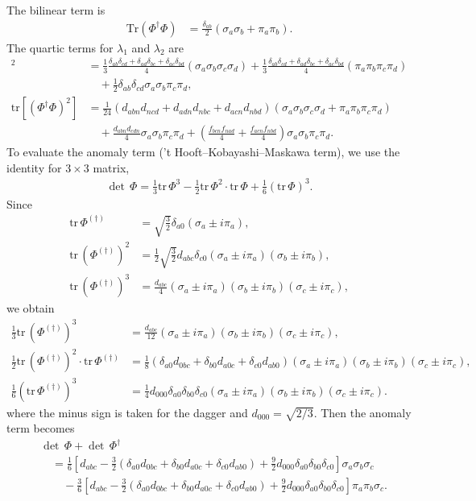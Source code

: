 \documentclass[a4paper,preprint,superscriptaddress,preprintnumbers,nofootinbib]{revtex4}
\newcommand{\al}[1]{\begin{align}#1\end{align}}
\newcommand{\nn}{\nonumber\\}
\newcommand{\tr}{\text{tr}}
\begin{document}
\begin{appendix}
The bilinear term is
\al{
\text{Tr}(\Phi^\dagger\Phi)&=\frac{\delta_{ab}}{2}(\sigma_a\sigma_b+\pi_a\pi_b).
}
The quartic terms for $\lambda_1$ and $\lambda_2$ are 
\al{
[\tr(\Phi^\dagger\Phi)]^2
&=\frac{1}{3}\frac{\delta_{ab}\delta_{cd}+\delta_{ad}\delta_{bc}+\delta_{ac}\delta_{bd}}{4}
(\sigma_a\sigma_b\sigma_c\sigma_d)
+\frac{1}{3}\frac{\delta_{ab}\delta_{cd}+\delta_{ad}\delta_{bc}+\delta_{ac}\delta_{bd}}{4}(\pi_a\pi_b\pi_c\pi_d)\nn
&\quad+\frac{1}{2}\delta_{ab}\delta_{cd}\sigma_a\sigma_b\pi_c\pi_d,\\
\tr[(\Phi^\dagger\Phi)^2]
&=
\frac{1}{24}(d_{abn}d_{ncd}+d_{adn}d_{nbc}+d_{acn}d_{nbd})(\sigma_a\sigma_b\sigma_c\sigma_d+\pi_a\pi_b\pi_c\pi_d) \nn
&\quad+\frac{d_{abn}d_{cdn}}{4}\sigma_a\sigma_b\pi_c\pi_d
+\left(\frac{f_{bcn}f_{nad}}{4}+\frac{f_{acn}f_{nbd}}{4}\right)\sigma_a\sigma_b\pi_c\pi_d.
}
To evaluate the anomaly term ('t Hooft--Kobayashi--Maskawa term), we use the identity for $3\times 3$ matrix,
\al{
\det\,\Phi = \frac{1}{3}\tr\, \Phi^3-\frac{1}{2}\tr\,\Phi^2\cdot \tr\,\Phi+\frac{1}{6}(\tr\, \Phi)^3.
\label{determinant id}
}
Since
\al{
\tr\,\Phi^{(\dagger)}&=\sqrt{\frac{3}{2}}\delta_{a0}(\sigma_a\pm i\pi_a),\\
\tr\,(\Phi^{(\dagger)})^2&=\frac{1}{2}\sqrt{\frac{3}{2}}d_{abc}\delta_{c0}(\sigma_a\pm i\pi_a)(\sigma_b\pm i\pi_b),\\
\tr\,(\Phi^{(\dagger)})^3&=\frac{d_{abc}}{4}(\sigma_a\pm i\pi_a)(\sigma_b\pm i\pi_b)(\sigma_c\pm i\pi_c),
}
we obtain
\al{
 \frac{1}{3}\tr\, (\Phi^{(\dagger)})^3&=\frac{d_{abc}}{12}(\sigma_a\pm i\pi_a)(\sigma_b\pm i\pi_b)(\sigma_c\pm i\pi_c),\\
\frac{1}{2}\tr\,(\Phi^{(\dagger)})^2\cdot \tr\,\Phi^{(\dagger)}
&=\frac{1}{8}(\delta_{a0}d_{0bc}+\delta_{b0}d_{a0c}+\delta_{c0}d_{ab0})(\sigma_a\pm i\pi_a)(\sigma_b\pm i\pi_b)(\sigma_c\pm i\pi_c),\\
\frac{1}{6}(\tr\, \Phi^{(\dagger)})^3
&=\frac{1}{4}d_{000}\delta_{a0}\delta_{b0}\delta_{c0}(\sigma_a\pm i\pi_a)(\sigma_b\pm i\pi_b)(\sigma_c\pm i\pi_c).
}
where the minus sign is taken for the dagger and $d_{000}=\sqrt{2/3}$.
Then the anomaly term becomes
\al{
&\det\, \Phi +\det\, \Phi^\dagger\nn
&\quad=\frac{1}{6} 
\left[d_{abc}
-\frac{3}{2}(\delta_{a0}d_{0bc}+\delta_{b0}d_{a0c}+\delta_{c0}d_{ab0})
+\frac{9}{2}d_{000}\delta_{a0}\delta_{b0}\delta_{c0}
\right]\sigma_a\sigma_b\sigma_c\nn
&\qquad-\frac{3}{6} 
\left[d_{abc}
-\frac{3}{2}(\delta_{a0}d_{0bc}+\delta_{b0}d_{a0c}+\delta_{c0}d_{ab0})
+\frac{9}{2}d_{000}\delta_{a0}\delta_{b0}\delta_{c0}
\right] \pi_a\pi_b\sigma_c.
}
\fi


\end{appendix}
\end{document}
